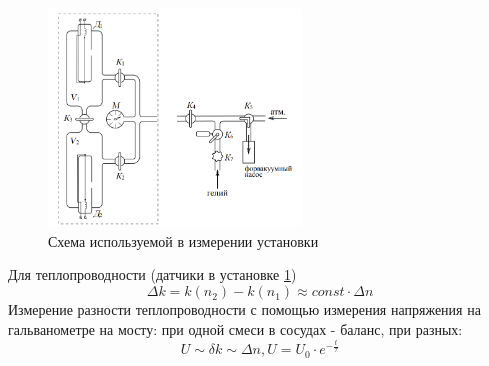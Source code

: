 \documentclass[a4paper,12pt]{article} %
\begin{document}
\begin{figure}[h!]
\begin{center}
\includegraphics[width=0.6\textwidth]{Трубы}
\end{center}
\caption{Схема используемой в измерении установки} \label{трубы}
\end{figure}

Для теплопроводности (датчики в установке \ref{трубы})
\begin{equation}
\Delta k = k(n_2)-k(n_1)\approx const\cdot \Delta n
\end{equation}
Измерение разности теплопроводности с помощью измерения напряжения на гальванометре на мосту: при одной смеси в сосудах - баланс, при разных:
\begin{equation}
U\sim \delta k \sim \Delta n, U = U_0\cdot e^{-\frac{t}{\tau}}
\end{equation}
\end{document}

